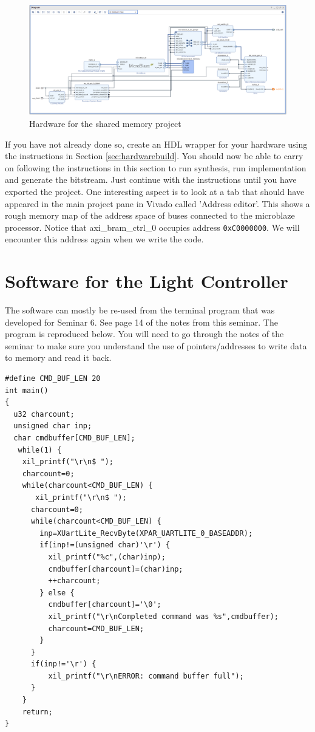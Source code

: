 \documentclass[../physical_computing.tex]{subfiles}
\begin{document}
\begin{figure}
\centering
\includegraphics[width=18cm]{appendix_10/figures/sharedmemoryhardware.png}
\caption{Hardware for the shared memory project}
\label{fig:sharedmemoryhardware}
\end{figure}

If you have not already done so, create an HDL wrapper for your hardware using the instructions in Section 
\ref{sec:hardwarebuild}. You should now be able to carry on following the instructions in this section to 
run synthesis, run implementation and generate the bitstream. Just continue with the instructions until you 
have exported the project. One interesting aspect is to look at a tab that should have appeared in the main 
project pane in Vivado called 'Address editor'. This shows a rough memory map of the address space of buses
connected to the microblaze processor. Notice that axi\_bram\_ctrl\_0 occupies address \texttt{0xC0000000}. We
will encounter this address again when we write the code.

\section{Software for the Light Controller}
\label{sec:lightcontrolsoftware}

The software can mostly be re-used from the terminal program that was developed for Seminar 6. See page 14 of
the notes from this seminar. The program is reproduced below. You will need to go through the notes of the seminar
to make sure you understand the use of pointers/addresses to write data to memory and read it back. 

\begin{verbatim}
#define CMD_BUF_LEN 20
int main()
{
  u32 charcount;
  unsigned char inp;
  char cmdbuffer[CMD_BUF_LEN];
   while(1) {
    xil_printf("\r\n$ ");
    charcount=0;
    while(charcount<CMD_BUF_LEN) {
       xil_printf("\r\n$ ");
	  charcount=0;
	  while(charcount<CMD_BUF_LEN) {
		inp=XUartLite_RecvByte(XPAR_UARTLITE_0_BASEADDR);
		if(inp!=(unsigned char)'\r') {
		  xil_printf("%c",(char)inp);
		  cmdbuffer[charcount]=(char)inp;
		  ++charcount;
		} else {
		  cmdbuffer[charcount]='\0';
		  xil_printf("\r\nCompleted command was %s",cmdbuffer);
		  charcount=CMD_BUF_LEN;
		}
	  }
	  if(inp!='\r') {
		  xil_printf("\r\nERROR: command buffer full");
	  }
	}
    return;
}
\end{verbatim}
\end{document}
